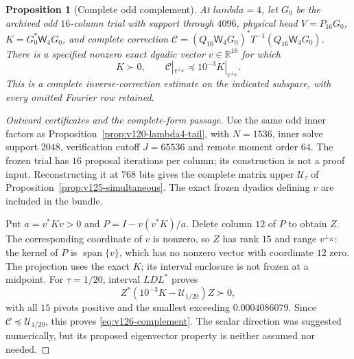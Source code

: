 \documentclass[11pt]{article}
\def\lambda{lambda}%
\newtheorem{proposition}[theorem]{Proposition}
\theoremstyle{remark}
\begin{document}
\begin{proposition}[Complete odd complement]
\label{prop:v126-odd-complement}
At $\lambda=4$, let $G_0$ be the archived odd $16$-column trial
with support through $4096$, physical head $V=P_{16}G_0$,
$K=G_0^*\mathsf W_4G_0$, and complete correction
$\mathcal C=(Q_{16}\mathsf W_4G_0)^*T^{-1}
                (Q_{16}\mathsf W_4G_0)$.
There is a specified nonzero exact dyadic vector $v\in\mathbb R^{16}$
for which
\begin{equation}\label{eq:v126-complement}
 K\succ0,\qquad
 \mathcal C|_{v^{\perp_K}}\preceq10^{-3}K|_{v^{\perp_K}}.
\end{equation}
This is a complete inverse-correction estimate on the indicated
subspace, with every omitted Fourier row retained.
\end{proposition}
\begin{proof}[Outward certificates and the complete-form passage]
Use the same odd inner factors as
Proposition~\ref{prop:v120-lambda4-tail}, with $N=1536$,
inner solve support $2048$, verification cutoff $J=65536$ and
remote moment order $64$.  The frozen trial has $16$ proposal
iterations per column; its construction is not a proof input.
Reconstructing it at $768$ bits gives the complete matrix upper
$\mathcal U_\tau$ of Proposition~\ref{prop:v125-simultaneous}.
The exact frozen dyadics defining $v$ are included in the bundle.

Put $a=v^*Kv>0$ and $P=I-v(v^*K)/a$.  Delete column $12$ of
$P$ to obtain $Z$.  The corresponding coordinate of $v$ is nonzero,
so $Z$ has rank $15$ and range $v^{\perp_K}$: the kernel of $P$
is $\operatorname{span}\{v\}$, which has no nonzero vector
with coordinate $12$ zero.  The projection uses the exact $K$;
its interval enclosure is not frozen at a midpoint.  For
$\tau=1/20$, interval $LDL^*$ proves
\[
 Z^*(10^{-3}K-\mathcal U_{1/20})Z\succ0,
\]
with all $15$ pivots positive and the smallest exceeding
$0.0004086079$.  Since $\mathcal C\preceq\mathcal U_{1/20}$,
this proves \eqref{eq:v126-complement}.  The scalar direction
was suggested numerically, but its proposed eigenvector property
is neither assumed nor needed.

\end{proof}
\end{document}
